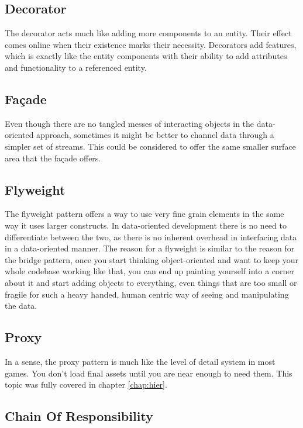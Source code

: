\subsection{Decorator}

The decorator acts much like adding more components to an entity. Their effect
comes online when their existence marks their necessity. Decorators add
features, which is exactly like the entity components with their ability to add
attributes and functionality to a referenced entity.

\subsection{Fa\c{c}ade}

Even though there are no tangled messes of interacting objects in the
data-oriented approach, sometimes it might be better to channel data through a
simpler set of streams. This could be considered to offer the same smaller
surface area that the fa\c{c}ade offers.

\subsection{Flyweight}

The flyweight pattern offers a way to use very fine grain elements in the same
way it uses larger constructs. In data-oriented development there is no need to
differentiate between the two, as there is no inherent overhead in interfacing
data in a data-oriented manner. The reason for a flyweight is similar to the
reason for the bridge pattern, once you start thinking object-oriented and want
to keep your whole codebase working like that, you can end up painting yourself
into a corner about it and start adding objects to everything, even things that
are too small or fragile for such a heavy handed, human centric way of seeing
and manipulating the data.

\subsection{Proxy}

In a sense, the proxy pattern is much like the level of detail system in most
games. You don't load final assets until you are near enough to need them. This
topic was fully covered in chapter \ref{chap:hier}.

\subsection{Chain Of Responsibility}

